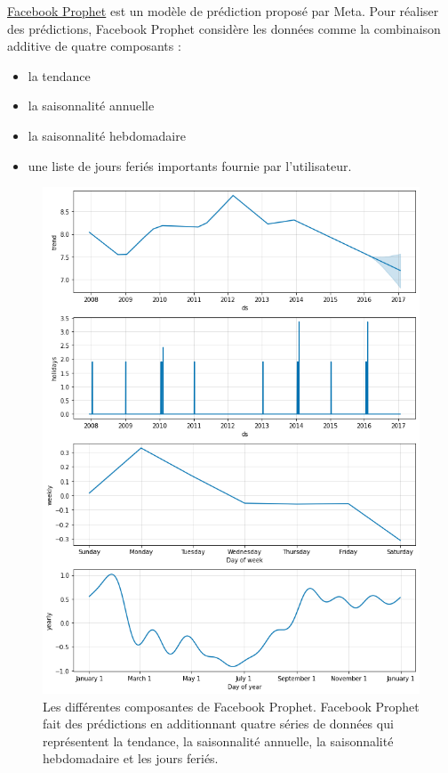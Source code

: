 \documentclass[french]{article}
\begin{document}
    \href{https://facebook.github.io/prophet/}{Facebook Prophet} est un modèle de prédiction proposé par Meta. 
    Pour réaliser des prédictions, Facebook Prophet considère les données comme la combinaison additive de quatre composants\cite{meta} : 
    \begin{itemize}
        \item la tendance
        \item la saisonnalité annuelle
        \item la saisonnalité hebdomadaire
        \item une liste de jours feriés importants fournie par l'utilisateur.
    \end{itemize}
    \begin{figure}[h!]
        \includegraphics[width=12cm]{facebook_prophet}
        \centering
        \caption{Les différentes composantes de Facebook Prophet. Facebook Prophet fait des prédictions en additionnant quatre séries de données qui représentent la tendance, la saisonnalité annuelle, la saisonnalité hebdomadaire et les jours feriés.}
        \centering
    \end{figure}
\end{document}
